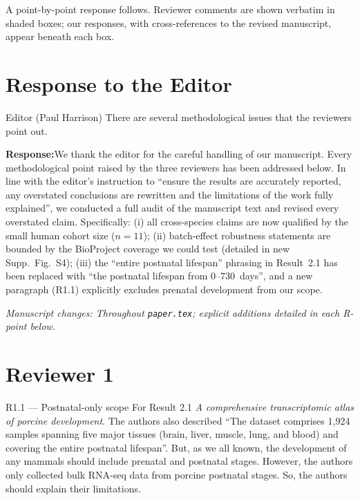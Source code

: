 \documentclass[11pt,a4paper]{article}
\newcommand{\response}[1]{%
  \par\vspace{2pt}\noindent\textbf{\textcolor{respcolor}{Response:}}\;\;#1\par\vspace{6pt}}
\newcommand{\changeloc}[1]{\par\noindent\textit{\small Manuscript changes: #1}\par}
\begin{document}
A point-by-point response follows. Reviewer comments are shown verbatim in
shaded boxes; our responses, with cross-references to the revised manuscript,
appear beneath each box.

\section*{Response to the Editor}

\begin{reviewerbox}{Editor (Paul Harrison)}
There are several methodological issues that the reviewers point out.
\end{reviewerbox}

\response{We thank the editor for the careful handling of our manuscript. Every
methodological point raised by the three reviewers has been addressed below.
In line with the editor's instruction to ``ensure the results are accurately
reported, any overstated conclusions are rewritten and the limitations of the
work fully explained'', we conducted a full audit of the manuscript text and
revised every overstated claim. Specifically: (i) all cross-species claims are
now qualified by the small human cohort size ($n=11$); (ii) batch-effect
robustness statements are bounded by the BioProject coverage we could test
(detailed in new Supp.\ Fig.~S4); (iii) the ``entire postnatal lifespan''
phrasing in Result~2.1 has been replaced with ``the postnatal lifespan from
0–730~days'', and a new paragraph (R1.1) explicitly excludes prenatal
development from our scope.}
\changeloc{Throughout \texttt{paper.tex}; explicit additions detailed in each
R-point below.}

\section*{Reviewer 1}

\begin{reviewerbox}{R1.1 — Postnatal-only scope}
For Result 2.1 \emph{A comprehensive transcriptomic atlas of porcine development}.
The authors also described ``The dataset comprises 1,924 samples spanning five
major tissues (brain, liver, muscle, lung, and blood) and covering the entire
postnatal lifespan''. But, as we all known, the development of any mammals
should include prenatal and postnatal stages. However, the authors only
collected bulk RNA-seq data from porcine postnatal stages. So, the authors
should explain their limitations.
\end{reviewerbox}
\end{document}
